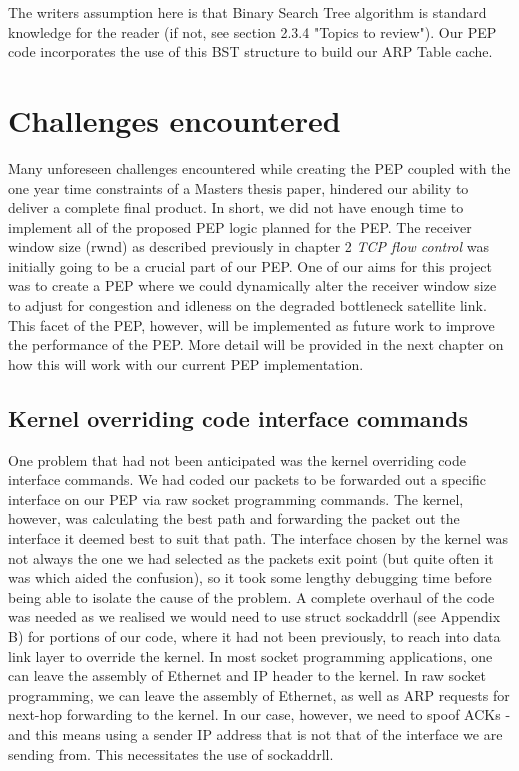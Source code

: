 \begin{appendices}
The writers assumption here is that Binary Search Tree algorithm is standard knowledge for the reader (if not, see section 2.3.4 "Topics to review"). Our PEP code incorporates the use of this BST structure to build our ARP Table cache. \\

\section{Challenges encountered}

Many unforeseen challenges encountered while creating the PEP coupled with the one year time constraints of a Masters thesis paper, hindered our ability to deliver a complete final product. In short, we did not have enough time to implement all of the proposed PEP logic planned for the PEP. The receiver window size (rwnd) as described previously in chapter 2 \emph{TCP flow control} was initially going to be a crucial part of our PEP. One of our aims for this project was to create a PEP where we could dynamically alter the receiver window size to adjust for congestion and idleness on the degraded bottleneck satellite link. This facet of the PEP, however, will be implemented as future work to improve the performance of the PEP. More detail will be provided in the next chapter on how this will work with our current PEP implementation.

\subsection{Kernel overriding code interface commands}
One problem that had not been anticipated was the kernel overriding code interface commands. We had coded our packets to be forwarded out a specific interface on our PEP via raw socket programming commands. The kernel, however, was calculating the best path and forwarding the packet out the interface it deemed best to suit that path. The interface chosen by the kernel was not always the one we had selected as the packets exit point (but quite often it was which aided the confusion), so it took some lengthy debugging time before being able to isolate the cause of the problem. A complete overhaul of the code was needed as we realised we would need to use struct sockaddr\textunderscore ll (see Appendix B)  for portions of our code, where it had not been previously, to reach into data link layer to override the kernel. 
In most socket programming applications, one can leave the assembly of Ethernet and IP header to the kernel. In raw socket programming, we can leave the assembly of Ethernet, as well as ARP requests for next-hop forwarding to the kernel. In our case, however, we need to spoof ACKs - and this means using a sender IP address that is not that of the interface we are sending from. This necessitates the use of sockaddr\textunderscore ll. 


\end{appendices}
